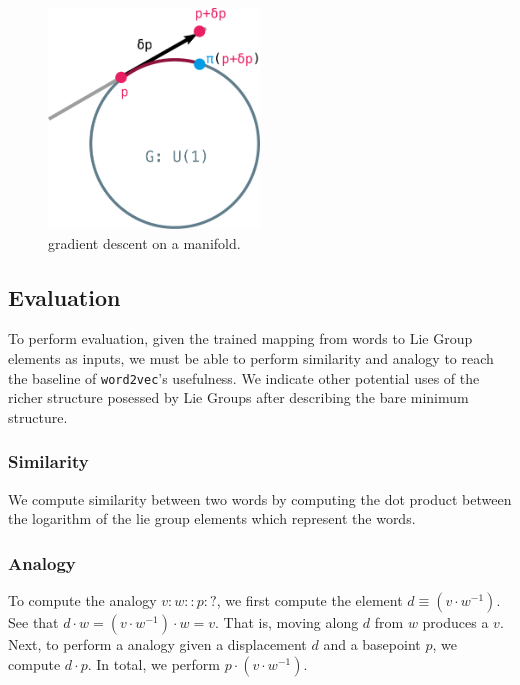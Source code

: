 \documentclass[11pt]{book}
\begin{document}
\begin{figure}[htb]
\includegraphics[width=0.5\textwidth]{./gradient-manifold.pdf}
\caption{gradient descent on a manifold.}
\end{figure}


\subsection{Evaluation}

To perform evaluation, given the trained mapping from words to Lie Group
elements as inputs, we must be able to perform similarity and analogy to reach
the baseline of \texttt{word2vec}'s usefulness. We indicate other potential
uses of the richer structure posessed by Lie Groups after describing the bare
minimum structure.

\subsubsection{Similarity} We compute similarity between two words by computing the dot product between
the logarithm of the lie group elements which represent the words. 


\subsubsection{Analogy} To compute the analogy $v:w::p:?$, we first compute the element $d \equiv (v \cdot w^{-1})$.
See that $d \cdot w = (v \cdot w^{-1}) \cdot w = v$. That is, moving along $d$ from $w$ produces a $v$.
Next, to perform a analogy given a displacement $d$ and a basepoint $p$, we compute $d \cdot p$. In total,
we perform $p \cdot (v \cdot w^{-1})$.
\end{document}
